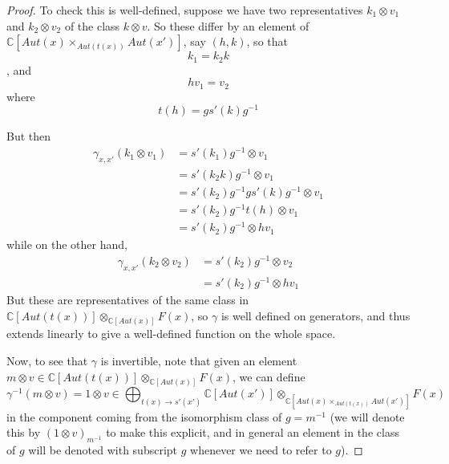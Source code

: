 \documentclass[10pt]{amsart}
\numberwithin{theorem}{subsection}
\newcommand{\ra}{\mathop{\rightarrow}}
\begin{document}
\begin{proof}
To check this is well-defined, suppose we have two representatives
$k_1 \otimes v_1$ and $k_2 \otimes v_2$ of the class $k \otimes v$.
So these differ by an element of $\mathbb{C}[Aut(x) \times_{Aut(t(x))} Aut({x'})]$,
say $(h,k)$, so that
\begin{equation}
k_1 = k_2 k
\end{equation}, 
and
\begin{equation}
h v_1 =  v_2
\end{equation}
where
\begin{equation}
t(h) = g s'(k) g^{-1}
\end{equation}

But then
\begin{align}
\gamma_{x,x'}(k_1 \otimes v_1) & = s'(k_1) g^{-1} \otimes v_1 \\
\nonumber & = s'(k_2 k) g^{-1} \otimes v_1 \\
\nonumber & = s'(k_2) g^{-1} g s'(k) g^{-1} \otimes v_1 \\
\nonumber & = s'(k_2) g^{-1} t(h) \otimes v_1\\
\nonumber & = s'(k_2) g^{-1} \otimes h v_1
\end{align}
while on the other hand,
\begin{align}
\gamma_{x,x'} (k_2 \otimes v_2) & = s'(k_2) g^{-1} \otimes v_2\\
\nonumber & = s'(k_2) g^{-1} \otimes h v_1
\end{align}
But these are representatives of the same class in $\mathbb{C}[Aut(t(x))]
\otimes_{\mathbb{C}[Aut({x})]} F(x)$, so $\gamma$ is well defined on
generators, and thus extends linearly to give a well-defined function
on the whole space.

Now, to see that $\gamma$ is invertible, note that given an element $m
\otimes v \in \mathbb{C}[Aut(t(x))] \otimes_{\mathbb{C}[Aut({x})]} F(x)$, we can define
\begin{equation}
\gamma^{-1}(m \otimes v) = 1 \otimes v \in  \bigoplus_{t(x) \ra s'(x')} \mathbb{C}[Aut({x'})]
\otimes_{\mathbb{C}[Aut(x) \times_{Aut(t(x))} Aut({x'})]} F(x)
\end{equation}
in the component coming from the isomorphism class of $g = m^{-1}$ (we
will denote this by $(1 \otimes v)_{m^{-1}}$ to make this explicit,
and in general an element in the class of $g$ will be denoted with
subscript $g$ whenever we need to refer to $g$).


\end{proof}
\end{document}
